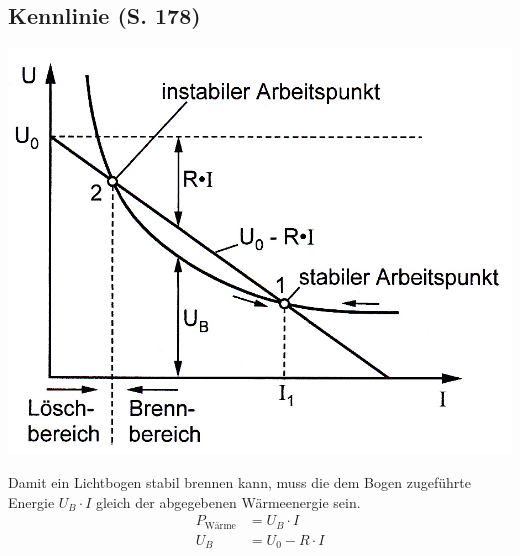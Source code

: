 \documentclass[a4paper,twocolumn,10pt]{article}
\begin{document}
\subsection{Kennlinie (S. 178)}
\begin{center}
\includegraphics[width=0.98\columnwidth]{Grafiken/Lichtbogen}
\end{center}
Damit ein Lichtbogen stabil brennen kann, muss die dem Bogen zugeführte Energie $U_B\cdot I$ gleich der abgegebenen Wärmeenergie sein.
\begin{equation*}
\begin{split}
P_\text{Wärme}&=U_B\cdot I\\
U_B&=U_0-R\cdot I
\end{split}
\end{equation*}
\end{document}
